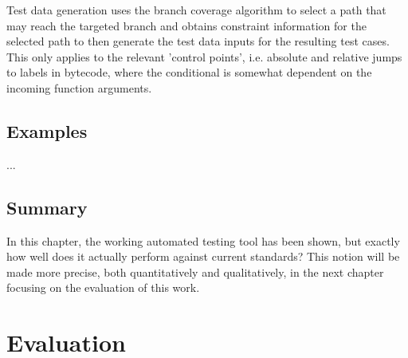\documentclass{icldt}
\numberwithin{equation}{section}       %
\begin{document}
{\begin{center}
\end{center}
Test data generation uses the branch coverage algorithm to select a path that may reach the targeted branch and obtains constraint information for the selected path to then generate the test data inputs for the resulting test cases. This only applies to the relevant 'control points', i.e. absolute and relative jumps to labels in bytecode, where the conditional is somewhat dependent on the incoming function arguments.

\section{Examples}
...
\section{Summary}
In this chapter, the working automated testing tool has been shown, but exactly how well does it actually perform against current standards? This notion will be made more precise, both quantitatively and qualitatively, in the next chapter focusing on the evaluation of this work.
\chapter{Evaluation}
\label{ch:eval}
}
\end{document}
